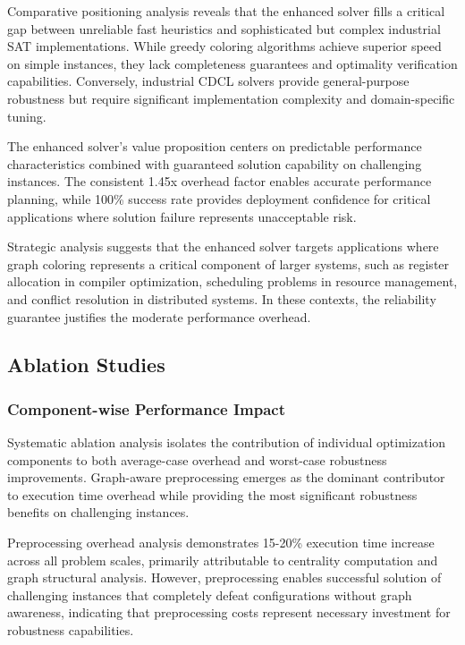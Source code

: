 Comparative positioning analysis reveals that the enhanced solver fills a critical gap between unreliable fast heuristics and sophisticated but complex industrial SAT implementations. While greedy coloring algorithms achieve superior speed on simple instances, they lack completeness guarantees and optimality verification capabilities. Conversely, industrial CDCL solvers provide general-purpose robustness but require significant implementation complexity and domain-specific tuning.

The enhanced solver's value proposition centers on predictable performance characteristics combined with guaranteed solution capability on challenging instances. The consistent 1.45x overhead factor enables accurate performance planning, while 100\% success rate provides deployment confidence for critical applications where solution failure represents unacceptable risk.

Strategic analysis suggests that the enhanced solver targets applications where graph coloring represents a critical component of larger systems, such as register allocation in compiler optimization, scheduling problems in resource management, and conflict resolution in distributed systems. In these contexts, the reliability guarantee justifies the moderate performance overhead.

\subsection{Ablation Studies}

\subsubsection{Component-wise Performance Impact}

Systematic ablation analysis isolates the contribution of individual optimization components to both average-case overhead and worst-case robustness improvements. Graph-aware preprocessing emerges as the dominant contributor to execution time overhead while providing the most significant robustness benefits on challenging instances.

Preprocessing overhead analysis demonstrates 15-20\% execution time increase across all problem scales, primarily attributable to centrality computation and graph structural analysis. However, preprocessing enables successful solution of challenging instances that completely defeat configurations without graph awareness, indicating that preprocessing costs represent necessary investment for robustness capabilities.

